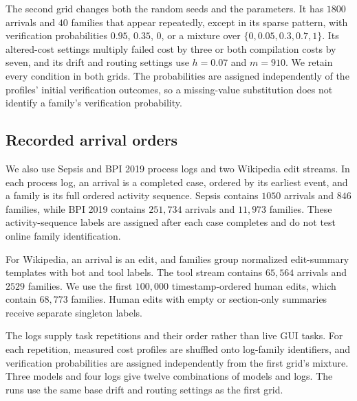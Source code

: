 The second grid changes both the random seeds and the parameters.
It has $1800$ arrivals and $40$ families that appear repeatedly, except in its sparse pattern, with verification probabilities $0.95$, $0.35$, $0$, or a mixture over $\{0,0.05,0.3,0.7,1\}$.
Its altered-cost settings multiply failed cost by three or both compilation costs by seven, and its drift and routing settings use $h=0.07$ and $m=910$.
We retain every condition in both grids.
The probabilities are assigned independently of the profiles' initial verification outcomes, so a missing-value substitution does not identify a family's verification probability.

\subsection{Recorded arrival orders}\label{app:arrival-orders}
We also use Sepsis and BPI 2019 process logs \citep{mannhardt2016sepsis,vandongen2019bpi} and two Wikipedia edit streams.
In each process log, an arrival is a completed case, ordered by its earliest event, and a family is its full ordered activity sequence.
Sepsis contains $1050$ arrivals and $846$ families, while BPI 2019 contains $251{,}734$ arrivals and $11{,}973$ families.
These activity-sequence labels are assigned after each case completes and do not test online family identification.

For Wikipedia, an arrival is an edit, and families group normalized edit-summary templates with bot and tool labels.
The tool stream contains $65{,}564$ arrivals and $2529$ families.
We use the first $100{,}000$ timestamp-ordered human edits, which contain $68{,}773$ families.
Human edits with empty or section-only summaries receive separate singleton labels.

The logs supply task repetitions and their order rather than live GUI tasks.
For each repetition, measured cost profiles are shuffled onto log-family identifiers, and verification probabilities are assigned independently from the first grid's mixture.
Three models and four logs give twelve combinations of models and logs.
The runs use the same base drift and routing settings as the first grid.

